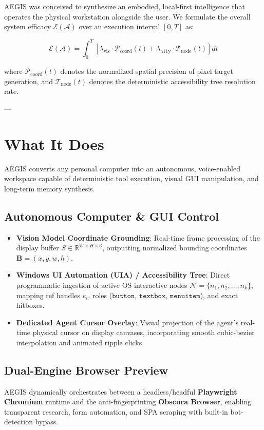\documentclass[11pt,a4paper]{article}
\begin{document}
AEGIS was conceived to synthesize an embodied, local-first intelligence that operates the physical workstation alongside the user. We formulate the overall system efficacy $\mathcal{E}(\mathcal{A})$ over an execution interval $[0, T]$ as:

\begin{equation}
\mathcal{E}(\mathcal{A}) = \int_{0}^{T} \left[ \lambda_{\text{vis}} \cdot \mathcal{P}_{\text{coord}}(t) + \lambda_{\text{a11y}} \cdot \mathcal{T}_{\text{node}}(t) \right] dt
\end{equation}

where $\mathcal{P}_{\text{coord}}(t)$ denotes the normalized spatial precision of pixel target generation, and $\mathcal{T}_{\text{node}}(t)$ denotes the deterministic accessibility tree resolution rate.

---

\section{What It Does}

AEGIS converts any personal computer into an autonomous, voice-enabled workspace capable of deterministic tool execution, visual GUI manipulation, and long-term memory synthesis.

\subsection{Autonomous Computer \& GUI Control}
\begin{itemize}
    \item \textbf{Vision Model Coordinate Grounding}: Real-time frame processing of the display buffer $S \in \mathbb{R}^{W \times H \times 3}$, outputting normalized bounding coordinates $\mathbf{B} = (x, y, w, h)$.
    \item \textbf{Windows UI Automation (UIA) / Accessibility Tree}: Direct programmatic ingestion of active OS interactive nodes $\mathcal{N} = \{n_1, n_2, \dots, n_k\}$, mapping ref handles $e_i$, roles ($\texttt{button}$, $\texttt{textbox}$, $\texttt{menuitem}$), and exact hitboxes.
    \item \textbf{Dedicated Agent Cursor Overlay}: Visual projection of the agent's real-time physical cursor on display canvases, incorporating smooth cubic-bezier interpolation and animated ripple clicks.
\end{itemize}

\subsection{Dual-Engine Browser Preview}
AEGIS dynamically orchestrates between a headless/headful \textbf{Playwright Chromium} runtime and the anti-fingerprinting \textbf{Obscura Browser}, enabling transparent research, form automation, and SPA scraping with built-in bot-detection bypass.
\end{document}
